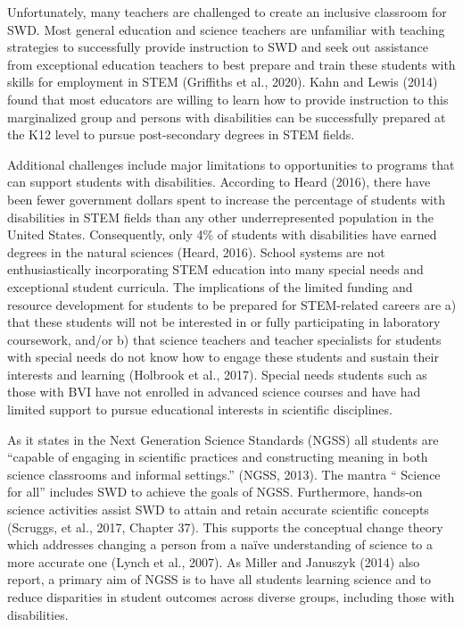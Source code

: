 \documentclass[11.5pt]{sig-alternate}
\begin{document}
\begin{large}
Unfortunately, many teachers are challenged to create an inclusive classroom for SWD. Most general education and science teachers are unfamiliar with teaching strategies to successfully provide instruction to SWD and seek out assistance from exceptional education teachers to best prepare and train these students with skills for employment in STEM (Griffiths et al., 2020). Kahn and Lewis (2014) found that most educators are willing to learn how to provide instruction to this marginalized group and persons with disabilities can be successfully prepared at the K12 level to pursue post-secondary degrees in STEM fields. 
	
Additional challenges include major limitations to opportunities to programs that can support students with disabilities. According to Heard (2016), there have been fewer government dollars spent to increase the percentage of students with disabilities in STEM fields than any other underrepresented population in the United States. Consequently, only 4\% of students with disabilities have earned degrees in the natural sciences (Heard, 2016). School systems are not enthusiastically incorporating STEM education into many special needs and exceptional student curricula. The implications of the limited funding and resource development for students to be prepared for STEM-related careers are a) that these students will not be interested in or fully participating in laboratory coursework, and/or b) that science teachers and teacher specialists for students with special needs do not know how to engage these students and sustain their interests and learning (Holbrook et al., 2017). Special needs students such as those with BVI have not enrolled in advanced science courses and have had limited support to pursue educational interests in scientific disciplines. 

As it states in the Next Generation Science Standards (NGSS) all students are “capable of engaging in scientific practices and constructing meaning in both science classrooms and informal settings.” (NGSS, 2013). The mantra “ Science for all” includes SWD to achieve the goals of NGSS. Furthermore, hands-on science activities assist SWD to attain and retain accurate scientific concepts (Scruggs, et al., 2017, Chapter 37). This supports the conceptual change theory which addresses changing a person from a naïve understanding of science to a more accurate one (Lynch et al., 2007). As Miller and Januszyk (2014) also report, a primary aim of NGSS is to have all students learning science and to reduce disparities in student outcomes across diverse groups, including those with disabilities. 


\end{large}
\end{document}
